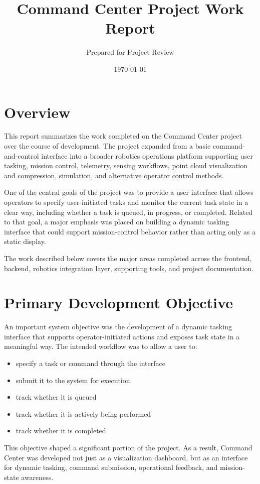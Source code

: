 \documentclass[11pt]{article}
\title{Command Center Project Work Report}
\author{Prepared for Project Review}
\date{\today}
\begin{document}
\maketitle

\section{Overview}

This report summarizes the work completed on the Command Center project over the course of development. The project expanded from a basic command-and-control interface into a broader robotics operations platform supporting user tasking, mission control, telemetry, sensing workflows, point cloud visualization and compression, simulation, and alternative operator control methods.

One of the central goals of the project was to provide a user interface that allows operators to specify user-initiated tasks and monitor the current task state in a clear way, including whether a task is queued, in progress, or completed. Related to that goal, a major emphasis was placed on building a dynamic tasking interface that could support mission-control behavior rather than acting only as a static display.

The work described below covers the major areas completed across the frontend, backend, robotics integration layer, supporting tools, and project documentation.

\section{Primary Development Objective}

An important system objective was the development of a dynamic tasking interface that supports operator-initiated actions and exposes task state in a meaningful way. The intended workflow was to allow a user to:

\begin{itemize}
  \item specify a task or command through the interface
  \item submit it to the system for execution
  \item track whether it is queued
  \item track whether it is actively being performed
  \item track whether it is completed
\end{itemize}

This objective shaped a significant portion of the project. As a result, Command Center was developed not just as a visualization dashboard, but as an interface for dynamic tasking, command submission, operational feedback, and mission-state awareness.
\end{document}
